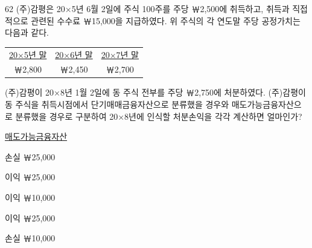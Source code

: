 \begin{question}{62}
(주)감평은 20×5년 6월 2일에 주식 100주를 주당 ￦2,500에 취득하고, 취득과 직접적으로 관련된 수수료 ￦15,000을 지급하였다. 위 주식의 각 연도말 주당 공정가치는 다음과 같다.
\begin{framedtext}
\centering\begin{tabular}{ccc}
\uline{20×5년 말} & \uline{20×6년 말} & \uline{20×7년 말} \\
￦2,800 & ￦2,450 & ￦2,700
\end{tabular}\par
\end{framedtext}
(주)감평이 20×8년 1월 2일에 동 주식 전부를 주당 ￦2,750에 처분하였다. (주)감평이 동 주식을 취득시점에서 단기매매금융자산으로 분류했을 경우와 매도가능금융자산으로 분류했을 경우로 구분하여 20×8년에 인식할 처분손익을 각각 계산하면 얼마인가?

\noindent\hspace*{2em}\uline{매도가능금융자산}\par
\begin{choices}
  \item {}손실 ￦25,000
  \item {}이익 ￦25,000
  \item {}이익 ￦10,000
  \item {}이익 ￦25,000
  \item {}손실 ￦10,000
\end{choices}
\end{question}
